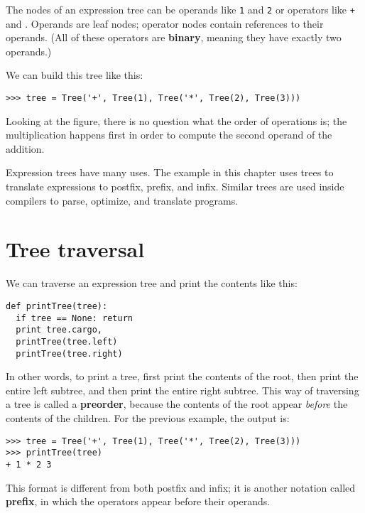 \beforefig
\centerline{}
\afterfig

The nodes of an expression tree can be operands like {\tt 1} and
{\tt 2} or operators like {\tt +} and {\tt *}.  Operands are leaf nodes;
operator nodes contain references to their operands.  (All of these
operators are {\bf binary}, meaning they have exactly two operands.)

We can build this tree like this:

\beforeverb
\begin{verbatim}
>>> tree = Tree('+', Tree(1), Tree('*', Tree(2), Tree(3)))
\end{verbatim}
\afterverb
%
Looking at the figure, there is no question what the order of
operations is; the multiplication happens first in order to compute
the second operand of the addition.

Expression trees have many uses.  The example in this chapter uses
trees to translate expressions to postfix, prefix, and infix.
Similar trees are used inside compilers to parse, optimize, and
translate programs.


\section {Tree traversal}

We can traverse an expression tree and print the contents like this:

\beforeverb
\begin{verbatim}
def printTree(tree):
  if tree == None: return
  print tree.cargo,
  printTree(tree.left)
  printTree(tree.right)
\end{verbatim}
\afterverb
%

In other words, to print a tree, first print the contents of
the root, then print the entire left subtree, and then print the
entire right subtree.  This way of traversing a tree is called
a {\bf preorder}, because the contents of the root appear {\em before}
the contents of the children.
For the previous example, the output is:

\beforeverb
\begin{verbatim}
>>> tree = Tree('+', Tree(1), Tree('*', Tree(2), Tree(3)))
>>> printTree(tree)
+ 1 * 2 3
\end{verbatim}
\afterverb
%
This format is different from both postfix and infix; it is another
notation called {\bf prefix}, in which the operators appear before
their operands.

